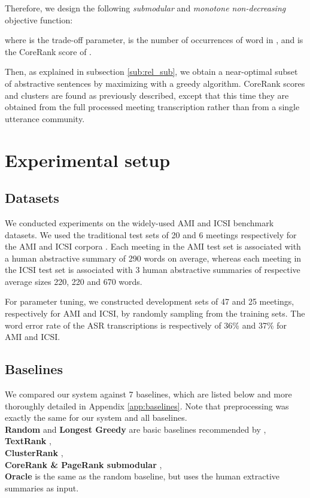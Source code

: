 \documentclass[11pt,a4paper]{article}
\begin{document}
Therefore, we design the following \textit{submodular} and \textit{monotone non-decreasing} objective function:

where  is the trade-off parameter,  is the number of occurrences of word  in , and  is the CoreRank score of .

Then, as explained in subsection \ref{sub:rel_sub}, we obtain a near-optimal subset of abstractive sentences by maximizing  with a greedy algorithm. CoreRank scores and clusters are found as previously described, except that this time they are obtained from the full processed meeting transcription rather than from a single  utterance community.

\section{Experimental setup}

\subsection{Datasets} \label{subsec:datasets}
We conducted experiments on the widely-used AMI \cite{mccowan2005ami} and ICSI \cite{janin2003icsi} benchmark datasets. We used the traditional test sets of 20 and 6 meetings respectively for the AMI and ICSI corpora \cite{riedhammer2008packing}. Each meeting in the AMI test set is associated with a human abstractive summary of 290 words on average, whereas each meeting in the ICSI test set is associated with 3 human abstractive summaries of respective average sizes 220, 220 and 670 words. 

For parameter tuning, we constructed development sets of 47 and 25 meetings, respectively for AMI and ICSI, by randomly sampling from the training sets. The word error rate of the ASR transcriptions is respectively of 36\% and 37\% for AMI and ICSI.

\subsection{Baselines}
We compared our system against 7 baselines, which are listed below and more thoroughly detailed in Appendix \ref{app:baselines}. Note that preprocessing was exactly the same for our system and all baselines. \\
 \textbf{Random} and \textbf{Longest Greedy} are basic baselines recommended by  \cite{riedhammer2008packing}, \\ 
 \textbf{TextRank} \cite{mihalcea2004textrank}, \\
 \textbf{ClusterRank} \cite{garg2009clusterrank}, \\
 \textbf{CoreRank \& PageRank submodular} \cite{tixier2017combining}, \\
 \textbf{Oracle} is the same as the random baseline, but uses the human extractive summaries as input.
\end{document}
